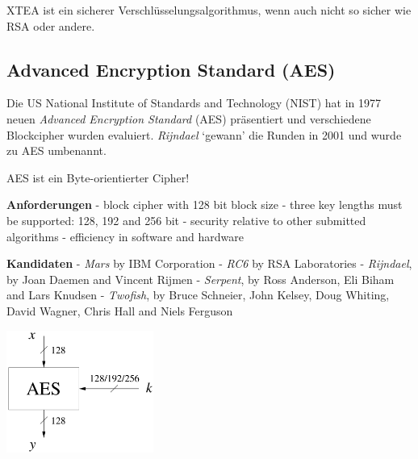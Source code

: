 \documentclass[
  10pt,
  a4paper,
]{article}
\begin{document}
\begin{multicols*}{2}
\begin{tcolorbox}
XTEA ist ein sicherer Verschlüsselungsalgorithmus, wenn auch nicht so
sicher wie RSA oder andere.

\end{tcolorbox}

\subsection{Advanced Encryption Standard
(AES)}\label{advanced-encryption-standard-aes}

Die US National Institute of Standards and Technology (NIST) hat in 1977
neuen \emph{Advanced Encryption Standard} (AES) präsentiert und
verschiedene Blockcipher wurden evaluiert. \emph{Rijndael} `gewann' die
Runden in 2001 und wurde zu AES umbenannt.

AES ist ein Byte-orientierter Cipher!

\begin{tcolorbox}[enhanced jigsaw, coltitle=black, toprule=.15mm, colframe=quarto-callout-note-color-frame, breakable, titlerule=0mm, title=\textcolor{quarto-callout-note-color}{\faInfo}\hspace{0.5em}{Anforderungen \& Kandidaten}, toptitle=1mm, colback=white, leftrule=.75mm, bottomtitle=1mm, colbacktitle=quarto-callout-note-color!10!white, left=2mm, bottomrule=.15mm, rightrule=.15mm, arc=.35mm, opacityback=0, opacitybacktitle=0.6]

\textbf{Anforderungen} - block cipher with 128 bit block size - three
key lengths must be supported: 128, 192 and 256 bit - security relative
to other submitted algorithms - efficiency in software and hardware

\textbf{Kandidaten} - \emph{Mars} by IBM Corporation - \emph{RC6} by RSA
Laboratories - \emph{Rijndael}, by Joan Daemen and Vincent Rijmen -
\emph{Serpent}, by Ross Anderson, Eli Biham and Lars Knudsen -
\emph{Twofish}, by Bruce Schneier, John Kelsey, Doug Whiting, David
Wagner, Chris Hall and Niels Ferguson

\end{tcolorbox}

\begin{center}
\includegraphics[width=\textwidth,height=4cm]{images/crypto/image-8.png}
\end{center}


\end{multicols*}
\end{document}
